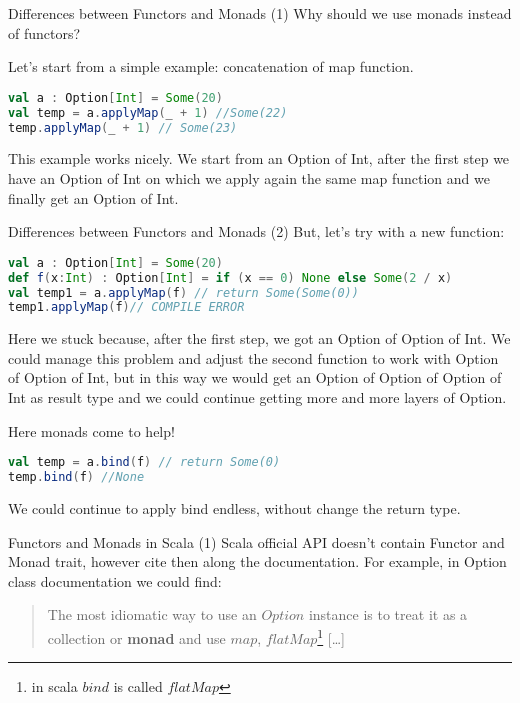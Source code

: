 \begin{frame}[fragile]{Differences between Functors and Monads (1)}
	Why should we use monads instead of functors?
	
	Let's start from a simple example: concatenation of map function.
\begin{lstlisting}[language=scala]
val a : Option[Int] = Some(20)
val temp = a.applyMap(_ + 1) //Some(22)
temp.applyMap(_ + 1) // Some(23)
\end{lstlisting}				
	This example works nicely. We start from an Option of Int, after the first step we have an Option of Int on which we apply again 
	the same map function and we finally get an Option of Int.
\end{frame}

\begin{frame}[fragile]{Differences between Functors and Monads (2)}
	But, let's try with a new function:
\begin{lstlisting}[language=scala]
val a : Option[Int] = Some(20)		
def f(x:Int) : Option[Int] = if (x == 0) None else Some(2 / x)
val temp1 = a.applyMap(f) // return Some(Some(0))
temp1.applyMap(f)// COMPILE ERROR
\end{lstlisting}	
	Here we stuck because, after the first step, we got an Option of Option of Int. 
	We could manage this problem and adjust the second function	to work with Option of Option of Int, 
	but in this way we would get an Option of Option of Option of Int as result type and we could continue getting more and more layers of Option.
	
	\pause
	
	Here monads come to help!
\begin{lstlisting}[language=scala]
val temp = a.bind(f) // return Some(0)
temp.bind(f) //None
\end{lstlisting}	
	We could continue to apply bind endless, without change the return type.
\end{frame}

\begin{frame}[fragile]{Functors and Monads in Scala (1)}
	Scala official API doesn't contain Functor and Monad trait, however cite then along the documentation.
	For example, in Option class documentation we could find:
	\begin{quotation}
		The most idiomatic way to use an $Option$ instance is to treat it as a collection or \textbf{monad} and use $map$, $flatMap$\footnote{in scala $bind$ is called $flatMap$} [\dots]
	\end{quotation}	
\end{frame}

